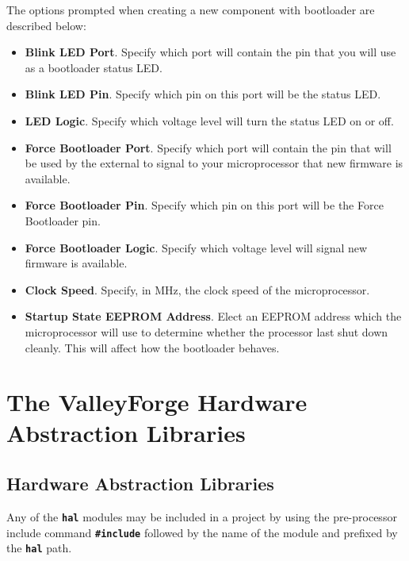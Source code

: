 \documentclass[a4paper, oneside, 11pt, titlepage, onecolumn, openright]{report}
\begin{document}
			The options prompted when creating a new component with bootloader are described below:
		
			\begin{itemize}

				\item \textbf{Blink LED Port}. Specify which port will contain the pin that you will use as a bootloader status LED.

				\item \textbf{Blink LED Pin}. Specify which pin on this port will be the status LED.

				\item \textbf{LED Logic}. Specify which voltage level will turn the status LED on or off.

				\item \textbf{Force Bootloader Port}. Specify which port will contain the pin that will be used by the external to signal to your microprocessor that new firmware is available.

				\item \textbf{Force Bootloader Pin}. Specify which pin on this port will be the Force Bootloader pin.

				\item \textbf{Force Bootloader Logic}. Specify which voltage level will signal new firmware is available.

				\item \textbf{Clock Speed}. Specify, in MHz, the clock speed of the microprocessor.

				\item \textbf{Startup State EEPROM Address}. Elect an EEPROM address which the microprocessor will use to determine whether the processor last shut down cleanly. This will affect how the bootloader behaves.

			\end{itemize}

	\part{The ValleyForge Hardware Abstraction Libraries}
		\label{part:hal}

		\chapter{Hardware Abstraction Libraries}
			\label{c:Hardware Abstraction Libraries}
			
			Any of the \textbf{\texttt{hal}} modules may be included in a project by using the pre-processor include command \textbf{\texttt{\#include}} followed by the name of the module and prefixed by the \textbf{\texttt{hal}} path.
			
\end{document}
